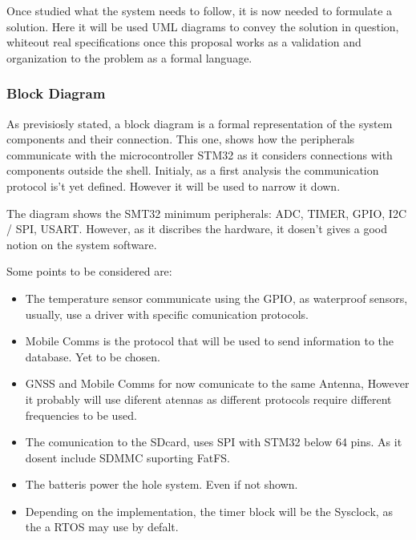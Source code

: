 Once studied what the system needs to follow, it is now needed to formulate a solution.
Here it will be used UML diagrams to convey the solution in question, whiteout real specifications
once this proposal works as a validation and organization to the problem as a formal language.

\subsubsection{Block Diagram}

As previsiosly stated, a block diagram is a formal representation of the system components
and their connection. This one, shows how the peripherals communicate with the microcontroller STM32
as it considers connections with components outside the shell. Initialy, as a first analysis
the communication protocol is't yet defined. However it will be used to narrow it down.

The diagram shows the SMT32 minimum peripherals: ADC, TIMER, GPIO, I2C / SPI, USART. However,
as it discribes the hardware, it dosen't gives a good notion on the system software. 

Some points to be considered are:
\begin{itemize}
    \item The temperature sensor communicate using the GPIO, as waterproof sensors, usually, use a driver with specific
    comunication protocols.
    \item Mobile Comms is the protocol that will be used to send information to the database. Yet to be chosen. 
    \item GNSS and Mobile Comms for now comunicate to the same Antenna, However it probably will use diferent atennas as different
    protocols require different frequencies to be used.
    \item The comunication to the SDcard, uses SPI with STM32 below 64 pins. As it dosent include SDMMC suporting FatFS.
    \item The batteris power the hole system. Even if not shown.
    \item Depending on the implementation, the timer block will be the Sysclock, as the a RTOS may use by defalt.
\end{itemize}

